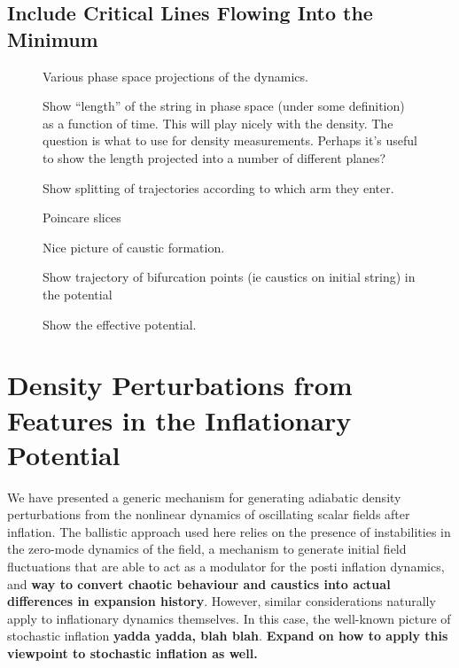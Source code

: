 \documentclass[11pt,a4paper]{article}
\begin{document}
\subsection{Include Critical Lines Flowing Into the Minimum}

\begin{figure}
  \caption{Various phase space projections of the dynamics.}
\end{figure}

\begin{figure}
  \caption{Show ``length'' of the string in phase space (under some definition) as a function of time.  This will play nicely with the density.  The question is what to use for density measurements.  Perhaps it's useful to show the length projected into a number of different planes?}
\end{figure}

\begin{figure}
  \caption{Show splitting of trajectories according to which arm they enter.}
\end{figure}

\begin{figure}
  \caption{Poincare slices}
\end{figure}

\begin{figure}
  \caption{Nice picture of caustic formation.}
\end{figure}

\begin{figure}
  \caption{Show trajectory of bifurcation points (ie caustics on initial string) in the potential}
\end{figure}

\begin{figure}
  \caption{Show the effective potential.}
\end{figure}

\section{Density Perturbations from Features in the Inflationary Potential}
We have presented a generic mechanism for generating adiabatic density perturbations from the nonlinear dynamics of oscillating scalar fields after inflation.
The ballistic approach used here relies on the presence of instabilities in the zero-mode dynamics of the field,
a mechanism to generate initial field fluctuations that are able to act as a modulator for the posti inflation dynamics,
and {\bf way to convert chaotic behaviour and caustics into actual differences in expansion history}.
However, similar considerations naturally apply to inflationary dynamics themselves.
In this case, the well-known picture of stochastic inflation {\bf yadda yadda, blah blah}.
{\bf Expand on how to apply this viewpoint to stochastic inflation as well.}
\end{document}
